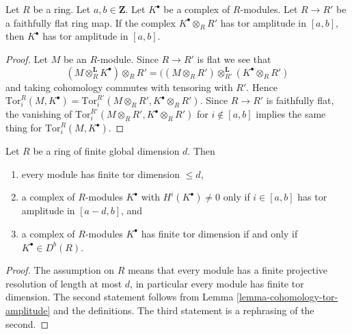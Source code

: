 \begin{lemma}
\label{lemma-flat-descent-tor-amplitude}
Let $R$ be a ring. Let $a, b \in \mathbf{Z}$. Let $K^\bullet$
be a complex of $R$-modules. Let $R \to R'$ be a faithfully flat
ring map. If the complex $K^\bullet \otimes_R R'$ has tor amplitude
in $[a, b]$, then $K^\bullet$ has tor amplitude in $[a, b]$.
\end{lemma}

\begin{proof}
Let $M$ be an $R$-module. Since $R \to R'$ is flat we see that
$$
(M \otimes_R^{\mathbf{L}} K^\bullet) \otimes_R R'
=
((M \otimes_R R') \otimes_{R'}^{\mathbf{L}} (K^\bullet \otimes_R R')
$$
and taking cohomology commutes with tensoring with $R'$.
Hence $\text{Tor}_i^R(M, K^\bullet) =
\text{Tor}_i^{R'}(M \otimes_R R', K^\bullet \otimes_R R')$.
Since $R \to R'$ is faithfully flat, the vanishing of
$\text{Tor}_i^{R'}(M \otimes_R R', K^\bullet \otimes_R R')$ for
$i \not \in [a, b]$ implies the same thing for
$\text{Tor}_i^R(M, K^\bullet)$.
\end{proof}

\begin{lemma}
\label{lemma-finite-gl-dim-tor-dimension}
Let $R$ be a ring of finite global dimension $d$. Then
\begin{enumerate}
\item every module has finite tor dimension $\leq d$,
\item a complex of $R$-modules $K^\bullet$ with $H^i(K^\bullet) \not = 0$
only if $i \in [a, b]$ has tor amplitude in $[a - d, b]$, and
\item a complex of $R$-modules $K^\bullet$ has finite tor dimension if and only
if $K^\bullet \in D^b(R)$.
\end{enumerate}
\end{lemma}

\begin{proof}
The assumption on $R$ means that every module has a finite projective
resolution of length at most $d$, in particular every module has finite
tor dimension. The second statement follows from
Lemma \ref{lemma-cohomology-tor-amplitude}
and the definitions. The third statement is a rephrasing of the second.
\end{proof}















